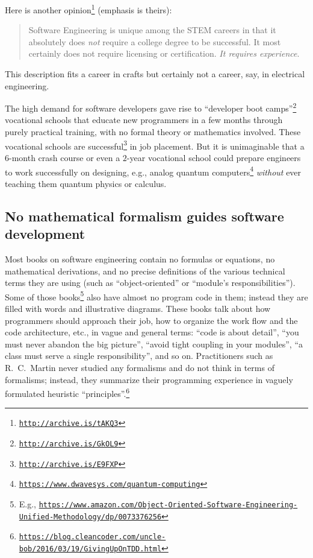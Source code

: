 Here is another opinion\footnote{\texttt{\href{http://archive.is/tAKQ3}{http://archive.is/tAKQ3}}}
(emphasis is theirs):
\begin{quotation}
{\small{}Software Engineering is unique among the STEM careers in
that it absolutely does }\emph{\small{}not}{\small{} require a college
degree to be successful. It most certainly does not require licensing
or certification. }\emph{\small{}It requires experience}{\small{}.}{\small\par}
\end{quotation}
This description fits a career in crafts \textemdash{} but certainly
not a career, say, in electrical engineering.

The high demand for software developers gave rise to \textsf{``}developer
boot camps\textsf{''}\footnote{\texttt{\href{http://archive.is/GkOL9}{http://archive.is/GkOL9}}}
\textemdash{} vocational schools that educate new programmers in a
few months through purely practical training, with no formal theory
or mathematics involved. These vocational schools are successful\footnote{\texttt{\href{http://archive.is/E9FXP}{http://archive.is/E9FXP}}}
in job placement. But it is unimaginable that a $6$-month crash course
or even a $2$-year vocational school could prepare engineers to work
successfully on designing, e.g., analog quantum computers\footnote{\texttt{\href{https://www.dwavesys.com/quantum-computing}{https://www.dwavesys.com/quantum-computing}}}
\emph{without} ever teaching them quantum physics or calculus.

\subsection{No mathematical formalism guides software development}

Most books on software engineering contain no formulas or equations,
no mathematical derivations, and no precise definitions of the various
technical terms they are using (such as \textsf{``}object-oriented\textsf{''} or \textsf{``}module\textsf{'}s
responsibilities\textsf{''}). Some of those books\footnote{E.g., \texttt{\href{https://www.amazon.com/Object-Oriented-Software-Engineering-Unified-Methodology/dp/0073376256}{https://www.amazon.com/Object-Oriented-Software-Engineering-Unified-Methodology/dp/0073376256}}}
also have almost no program code in them; instead they are filled
with words and illustrative diagrams. These books talk about how programmers
should approach their job, how to organize the work flow and the code
architecture, etc., in vague and general terms: \textsf{``}code is about detail\textsf{''},
\textsf{``}you must never abandon the big picture\textsf{''}, \textsf{``}avoid tight coupling
in your modules\textsf{''}, \textsf{``}a class must serve a single responsibility\textsf{''},
and so on. Practitioners such as R.\ C.\ Martin never studied any
formalisms and do not think in terms of formalisms; instead, they
summarize their programming experience in vaguely formulated heuristic
\textquotedblleft principles\textquotedblright .\footnote{\texttt{\href{https://blog.cleancoder.com/uncle-bob/2016/03/19/GivingUpOnTDD.html}{https://blog.cleancoder.com/uncle-bob/2016/03/19/GivingUpOnTDD.html}}}

